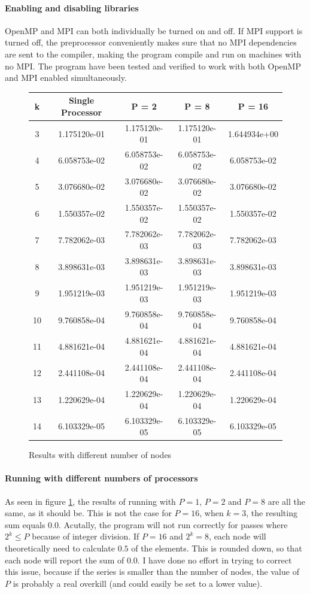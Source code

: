\documentclass{article}
\begin{document}
\paragraph{Enabling and disabling libraries}
OpenMP and MPI can both individually be turned on and off. If MPI support is turned off, the preprocessor conveniently makes sure that no MPI dependencies are sent to the compiler, making the program compile and run on machines with no MPI. The program have been tested and verified to work with both OpenMP and MPI enabled simultaneously.
\begin{figure}[h]
	\centering
\begin{tabular}{c | c c c c}
	\hline
	k & Single Processor & P = 2 & P = 8 & P = 16 \\
	\hline
	\hline
	3 	& 1.175120e-01 & 1.175120e-01 & 1.175120e-01 & 1.644934e+00 \\
	4 	& 6.058753e-02 & 6.058753e-02 & 6.058753e-02 & 6.058753e-02 \\
	5 	& 3.076680e-02 & 3.076680e-02 & 3.076680e-02 & 3.076680e-02 \\
	6	& 1.550357e-02 & 1.550357e-02 & 1.550357e-02 & 1.550357e-02 \\
	7	& 7.782062e-03 & 7.782062e-03 & 7.782062e-03 & 7.782062e-03 \\
	8	& 3.898631e-03 & 3.898631e-03 & 3.898631e-03 & 3.898631e-03 \\
	9	& 1.951219e-03 & 1.951219e-03 & 1.951219e-03 & 1.951219e-03 \\
	10	& 9.760858e-04 & 9.760858e-04 & 9.760858e-04 & 9.760858e-04 \\
	11	& 4.881621e-04 & 4.881621e-04 & 4.881621e-04 & 4.881621e-04 \\
	12	& 2.441108e-04 & 2.441108e-04 & 2.441108e-04 & 2.441108e-04 \\
	13	& 1.220629e-04 & 1.220629e-04 & 1.220629e-04 & 1.220629e-04 \\
	14	& 6.103329e-05 & 6.103329e-05 & 6.103329e-05 & 6.103329e-05 \\
	\hline
	
\end{tabular}
\caption{Results with different number of nodes}
\label{fig:results}
\end{figure}

\paragraph{Running with different numbers of processors}
As seen in figure \ref{fig:results}, the results of running with $P=1$, $P=2$ and $P=8$ are all the same, as it should be. This is not the case for $P=16$, when $k=3$, the resulting sum equals $0.0$. Acutally, the program will not run correctly for passes where $2^k \le P$ because of integer division. If $P=16$ and $2^k=8$, each node will theoretically need to calculate $0.5$ of the elements. This is rounded down, so that each node will report the sum of $0.0$. I have done no effort in trying to correct this issue, because if the series is smaller than the number of nodes, the value of $P$ is probably a real overkill (and could easily be set to a lower value).
\end{document}
